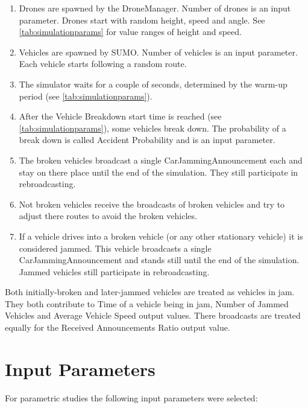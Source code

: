 \documentclass[]{nsm-thesis}
\begin{document}
\begin{enumerate}
	\item Drones are spawned by the DroneManager. Number of drones is an input parameter. Drones start with random height, speed and angle. See \cref{tab:simulationparams} for value ranges of height and speed.
	\item Vehicles are spawned by SUMO. Number of vehicles is an input parameter. Each vehicle starts following a random route.
	\item The simulator waits for a couple of seconds, determined by the warm-up period (see \cref{tab:simulationparams}).
	\item After the Vehicle Breakdown start time is reached (see \cref{tab:simulationparams}), some vehicles break down. The probability of a break down is called Accident Probability and is an input parameter.
  	\item The broken vehicles broadcast a single CarJammingAnnouncement each and stay on there place until the end of the simulation. They still participate in rebroadcasting.
	\item Not broken vehicles receive the broadcasts of broken vehicles and try to adjust there routes to avoid the broken vehicles.
	\item If a vehicle drives into a broken vehicle (or any other stationary vehicle) it is considered jammed. This vehicle broadcasts a single CarJammingAnnouncement and stands still until the end of the simulation. Jammed vehicles still participate in rebroadcasting.
\end{enumerate}

Both initially-broken and later-jammed vehicles are treated as vehicles in jam. They both contribute to Time of a vehicle being in jam, Number of Jammed Vehicles and Average Vehicle Speed output values. There broadcasts are treated equally for the Received Announcements Ratio output value. 



\section{Input Parameters}

For parametric studies the following input parameters were selected:
\end{document}
